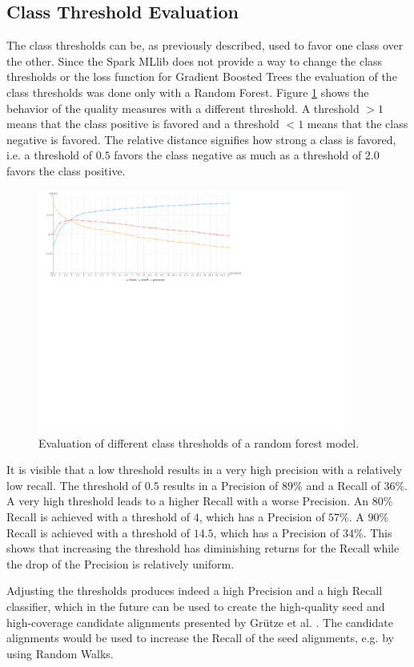 \subsection{Class Threshold Evaluation}
The class thresholds can be, as previously described, used to favor one class over the other. Since the Spark MLlib does not provide a way to change the class thresholds or the loss function for Gradient Boosted Trees the evaluation of the class thresholds was done only with a Random Forest. Figure \ref{rf_thresh_large} shows the behavior of the quality measures with a different threshold. A threshold $> 1$ means that the class positive is favored and a threshold $< 1$ means that the class negative is favored. The relative distance signifies how strong a class is favored, i.e. a threshold of $0.5$ favors the class negative as much as a threshold of $2.0$ favors the class positive.\par
\begin{figure}[H]
	\centering
	\includegraphics[width=0.9\textwidth]{img/rf_thresh_large}
	\caption{Evaluation of different class thresholds of a random forest model.}
	\label{rf_thresh_large}
\end{figure}
It is visible that a low threshold results in a very high precision with a relatively low recall. The threshold of $0.5$ results in a Precision of $89\%$ and a Recall of $36\%$. A very high threshold leads to a higher Recall with a worse Precision. An $80\%$ Recall is achieved with a threshold of $4$, which has a Precision of $57\%$. A $90\%$ Recall is achieved with a threshold of $14.5$, which has a Precision of $34\%$. This shows that increasing the threshold has diminishing returns for the Recall while the drop of the Precision is relatively uniform.\par
Adjusting the thresholds produces indeed a high Precision and a high Recall classifier, which in the future can be used to create the high-quality seed and high-coverage candidate alignments presented by Grütze et al. \cite{coheel}. The candidate alignments would be used to increase the Recall of the seed alignments, e.g. by using Random Walks.\par

